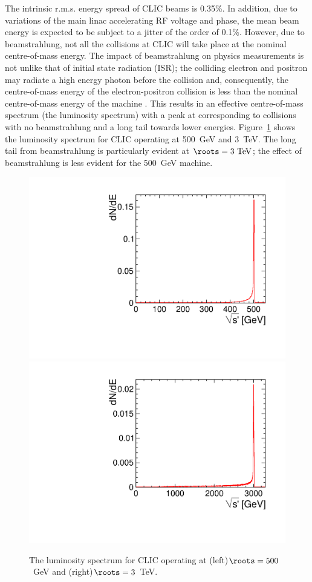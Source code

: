 The intrinsic r.m.s. energy spread of CLIC beams is 0.35\%. In addition, due to
variations of the main linac accelerating \acs{RF} voltage and phase, the mean beam
energy is expected to be subject to a jitter of the order of 0.1\%. However, due
to beamstrahlung, not all the \epem collisions at CLIC will take place at the
nominal centre-of-mass energy. The impact of beamstrahlung on physics
measurements is not unlike that of initial state radiation (ISR); the colliding
electron and positron may radiate a high energy photon before the collision
and, consequently, the centre-of-mass energy of the electron-positron
collision \rootsprime is less than the nominal centre-of-mass energy of the
machine \roots. This results in an effective centre-of-mass spectrum (the
luminosity spectrum) with a peak at \roots corresponding to collisions with
no beamstrahlung and a long tail towards lower energies.
Figure~\ref{fig:chap3:lumiSpectrum} shows the luminosity spectrum for CLIC
operating at 500~GeV and 3~TeV. The long tail from beamstrahlung is
particularly evident at $\roots = 3~\mathrm{TeV}$; the effect of beamstrahlung is less
evident for the 500~GeV machine. 

\begin{figure}[hbt]
  \centering
  \includegraphics[width=0.49\linewidth]{../Chap3_ExpCond_PhysPerfsReqs/Lumi500GeV_fixed.pdf}
  \includegraphics[width=0.49\linewidth]{../Chap3_ExpCond_PhysPerfsReqs/Lumi3TeV_fixed_nopeak.pdf}
  \caption{The luminosity spectrum for CLIC operating at (left)$\roots=500$~GeV and
    (right)$\roots=3$~TeV.\label{fig:chap3:lumiSpectrum}}
\end{figure}

